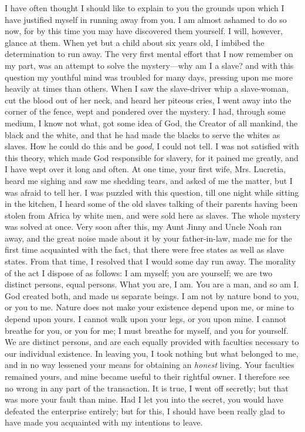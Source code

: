 I have often thought I should like to explain to you the grounds {}upon
which I have justified myself in running away from you. I am almost
ashamed to do so now, for by this time you may have discovered them
yourself. I will, however, glance at them. When yet but a child about
six years old, I imbibed the determination to run away. The very first
mental effort that I now remember on my part, was an attempt to solve
the mystery---why am I a slave? and with this question my youthful mind
was troubled for many days, pressing upon me more heavily at times than
others. When I saw the slave-driver whip a slave-woman, cut the blood
out of her neck, and heard her piteous cries, I went away into the
corner of the fence, wept and pondered over the mystery. I had, through
some medium, I know not what, got some idea of God, the Creator of all
mankind, the black and the white, and that he had made the blacks to
serve the whites as slaves. How he could do this and be \emph{good}, I
could not tell. I was not satisfied with this theory, which made God
responsible for slavery, for it pained me greatly, and I have wept over
it long and often. At one time, your first wife, Mrs. Lucretia, heard me
sighing and saw me shedding tears, and asked of me the matter, but I was
afraid to tell her. I was puzzled with this question, till one night
while sitting in the kitchen, I heard some of the old slaves talking of
their parents having been stolen from Africa by white men, and were sold
here as slaves. The whole mystery was solved at once. Very soon after
this, my Aunt Jinny and Uncle Noah ran away, and the great noise made
about it by your father-in-law, made me for the first time acquainted
with the fact, that there were free states as well as slave states. From
that time, I resolved that I would some day run away. The morality of
the act I dispose of as follows: I am myself; you are yourself; we are
two distinct persons, equal persons. What you are, I am. You are a man,
and so am I. God created both, and made us separate beings. I am not by
nature bond to you, or you to me. Nature does not make your existence
depend upon me, or mine to depend upon yours. I cannot walk upon your
legs, or you upon mine. I cannot breathe for you, or you for me; I must
breathe for myself, and you for yourself. We are distinct persons, and
are each equally provided with faculties necessary to our individual
existence. In leaving you, I took nothing but what belonged to me, and
in no way lessened your means for obtaining an \emph{honest} living.
Your faculties remained yours, and mine became useful to their rightful
owner. I therefore see no wrong in any part of the transaction. It is
true, I went off {}secretly; but that was more your fault than mine. Had
I let you into the secret, you would have defeated the enterprise
entirely; but for this, I should have been really glad to have made you
acquainted with my intentions to leave.

